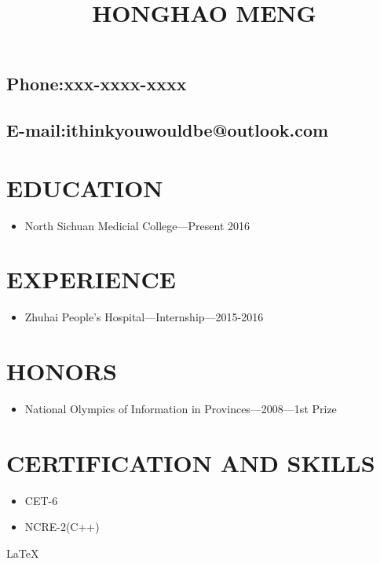 \documentclass{article}
\begin{document}
    \title{HONGHAO MENG}
    \author{}
    \date{}
    \maketitle
\subsection*{Phone:xxx-xxxx-xxxx}
\subsection*{E-mail:ithinkyouwouldbe@outlook.com}
\section*{EDUCATION}
\begin{itemize}
\item North Sichuan Medicial College---Present 2016
\end{itemize}
\section*{EXPERIENCE}
\begin{itemize}
\item Zhuhai People's Hospital---Internship---2015-2016
\end{itemize}
\section*{HONORS}
\begin{itemize}
\item National Olympics of Information in Provinces---2008---1st Prize
\end{itemize}
\section*{CERTIFICATION AND SKILLS}
\begin{itemize}
\item CET-6
\item NCRE-2(C++)
\end{itemize}
\LaTeX
\end{document}
